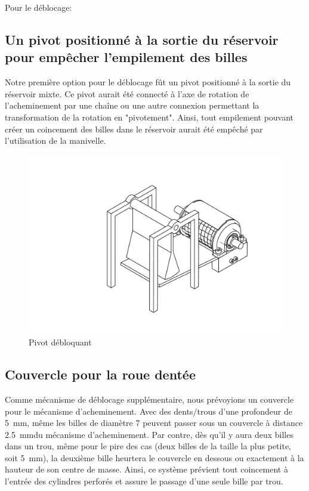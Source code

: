 Pour le déblocage: %
\subsection{Un pivot positionné à la sortie du réservoir pour empêcher l'empilement des billes} 
Notre première option pour le déblocage fût un pivot positionné à la sortie du réservoir mixte. Ce pivot aurait été connecté à l'axe de rotation de l'acheminement par une chaîne ou une autre connexion permettant la transformation de la rotation en "pivotement". Ainsi, tout empilement pouvant créer un coincement des billes dans le réservoir aurait été empêché par l'utilisation de la manivelle.

\begin{figure}
    \centering
    \includegraphics[width=\textwidth]{Graphics/Roue/DRAWING_PIVOT.pdf}
    \caption{Pivot débloquant}
\end{figure}

\subsection{Couvercle pour la roue dentée}
Comme mécanisme de déblocage supplémentaire, nous prévoyions un couvercle pour le mécanisme d'acheminement. Avec des dents/trous d'une profondeur de \SI{5}{\milli\metre}, même les billes de diamètre 7 peuvent passer sous un couvercle à distance \SI{2.5}{\milli\metre}du mécanisme d'acheminement. Par contre, dès qu'il y aura deux billes dans un trou, même pour le pire des cas (deux billes de la taille la plus petite, soit \SI{5}{\milli\metre}), la deuxième bille heurtera le couvercle en dessous ou exactement à la hauteur de son centre de masse. Ainsi, ce système prévient tout coincement à l'entrée des cylindres perforés et assure le passage d'une seule bille par trou.

